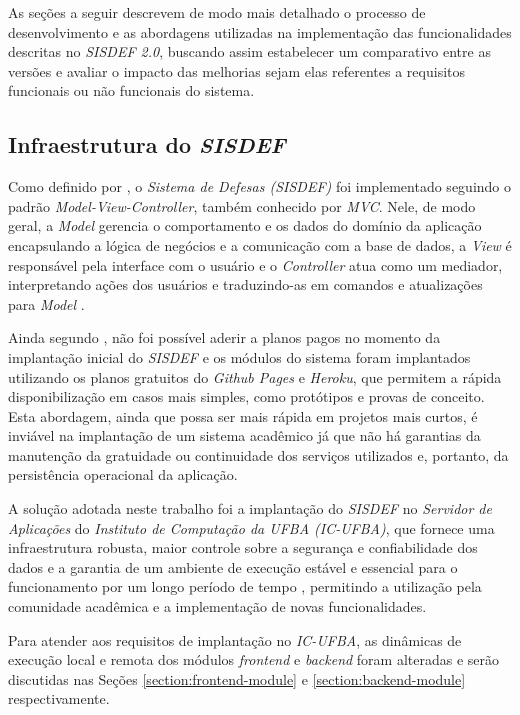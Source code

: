 \documentclass[nonacm, sigconf]{acmart}
\begin{document}
As seções a seguir descrevem de modo mais detalhado o processo de desenvolvimento e as abordagens utilizadas na implementação das funcionalidades descritas no \textit{SISDEF 2.0}, buscando assim estabelecer um comparativo entre as versões e avaliar o impacto das melhorias sejam elas referentes a requisitos funcionais ou não funcionais do sistema.

\subsection{Infraestrutura do \textit{SISDEF}}
\label{section:implantation}

Como definido por \cite{gabrieltcc}, o \textit{Sistema de Defesas (SISDEF)} foi implementado seguindo o padrão \textit{Model-View-Controller}, também conhecido por \textit{MVC}. Nele, de modo geral, a \textit{Model} gerencia o comportamento e os dados do domínio da aplicação encapsulando a lógica de negócios e a comunicação com a base de dados, a \textit{View} é responsável pela interface com o usuário e o \textit{Controller} atua como um mediador, interpretando ações dos usuários e traduzindo-as em comandos e atualizações para \textit{Model} \cite{burbeck1992}.

Ainda segundo \cite{gabrieltcc}, não foi possível aderir a planos pagos no momento da implantação inicial do \textit{SISDEF} e os módulos do sistema foram implantados utilizando os planos gratuitos do \textit{Github Pages} e \textit{Heroku}, que permitem a rápida disponibilização em casos mais simples, como protótipos e provas de conceito. Esta abordagem, ainda que possa ser mais rápida em projetos mais curtos, é inviável na implantação de um sistema acadêmico já que não há garantias da manutenção da gratuidade ou continuidade dos serviços utilizados e, portanto, da persistência operacional da aplicação.

A solução adotada neste trabalho foi a implantação do \textit{SISDEF} no  \textit{Servidor de Aplicações} do \textit{Instituto de Computação da UFBA (IC-UFBA)}, que fornece uma infraestrutura robusta, maior controle sobre a segurança e confiabilidade dos dados e a garantia de um ambiente de execução estável e essencial para o funcionamento por um longo período de tempo \cite{chang2010transforming}, permitindo a utilização pela comunidade acadêmica e a implementação de novas funcionalidades.

Para atender aos requisitos de implantação no \textit{IC-UFBA}, as dinâmicas de execução local e remota dos módulos \textit{frontend} e \textit{backend} foram alteradas e serão discutidas nas Seções \ref{section:frontend-module} e \ref{section:backend-module} respectivamente.
\end{document}
